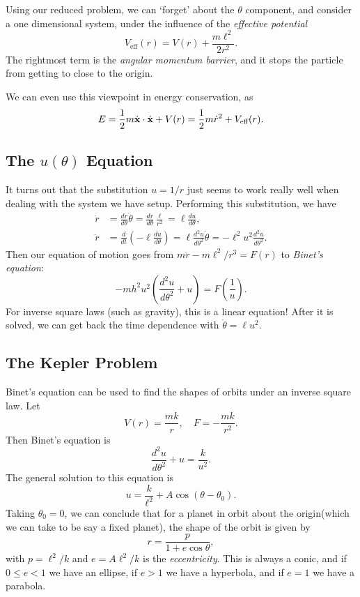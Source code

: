 \documentclass[a4paper]{scrartcl}
\begin{document}
Using our reduced problem, we can `forget' about the $\theta$ component, and consider a one dimensional system, under the influence of the \emph{effective potential}
$$
V_{\text{eff}}(r) = V(r) + \frac{m \ell^2}{2r^2}.
$$
The rightmost term is the \emph{angular momentum barrier}, and it stops the particle from getting to close to the origin.

We can even use this viewpoint in energy conservation, as
$$
E = \frac{1}{2}m \dot{\mathbf{x}} \cdot \dot{\mathbf{x}} + V(r) = \frac{1}{2}m \dot{r}^2 + V_{\text{eff}}(r).
$$

\subsection{The $u(\theta)$ Equation}

It turns out that the substitution $u = 1/r$ just seems to work really well when dealing with the system we have setup. Performing this substitution, we have
\begin{align*}
	\dot{r} &= \frac{dr}{d \theta} \dot{\theta} = \frac{dr}{d\theta} \frac{\ell}{r^2} = \ell \frac{du}{d \theta}, \\
	\ddot{r} &= \frac{d}{dt}\left(- \ell \frac{du}{d\theta}\right) = \ell \frac{d^2 u}{d\theta^2}\dot{\theta} = -\ell^2 u^2 \frac{d^2 u}{d \theta^2}.
\end{align*}
Then our equation of motion goes from $m \ddot{r} - m\ell^2/r^3 = F(r)$ to \emph{Binet's equation}:
$$
-mh^2 u^2 \left(\frac{d^2 u }{d \theta^2} + u\right) = F\left(\frac{1}{u}\right).
$$
For inverse square laws (such as gravity), this is a linear equation! After it is solved, we can get back the time dependence with
$\dot{\theta} = \ell u^2$.


\subsection{The Kepler Problem}

Binet's equation can be used to find the shapes of orbits under an inverse square law. Let
$$
V(r) = \frac{mk}{r}, \quad F = -\frac{mk}{r^2}.
$$
Then Binet's equation is
$$
\frac{d^2 u}{d \theta^2} + u = \frac{k}{u^2}.
$$
The general solution to this equation is
$$
u = \frac{k}{\ell^2} + A \cos(\theta - \theta_0).
$$
Taking $\theta_0 = 0$, we can conclude that for a planet in orbit about the origin(which we can take to be say a fixed planet), the shape of the orbit is given by
$$
r = \frac{p}{1 + e \cos \theta},
$$
with $p = \ell^2/k$ and $e = A \ell^2/k$ is the \emph{eccentricity}. This is always a conic, and if $0 \leq e < 1$ we have an ellipse, if $e > 1$ we have a hyperbola, and if $e = 1$ we have a parabola.
\end{document}
